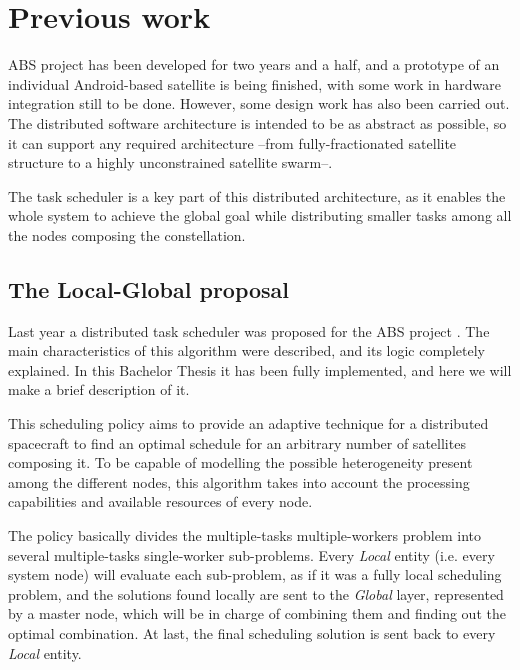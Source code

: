 \section{Previous work}

ABS project has been developed for two years and a half, and a prototype of an individual Android-based satellite is being finished, with some work in hardware integration still to be done. However, some design work has also been carried out. The distributed software architecture is intended to be as abstract as possible, so it can support any required architecture --from fully-fractionated satellite structure to a highly unconstrained satellite swarm--.

The task scheduler is a key part of this distributed architecture, as it enables the whole system to achieve the global goal while distributing smaller tasks among all the nodes composing the constellation.

\subsection{The Local-Global proposal}

Last year a distributed task scheduler was proposed for the ABS project \citep{Araguz15}. The main characteristics of this algorithm were described, and its logic completely explained. In this Bachelor Thesis it has been fully implemented, and here we will make a brief description of it.

This scheduling policy aims to provide an adaptive technique for a distributed spacecraft to find an optimal schedule for an arbitrary number of satellites composing it. To be capable of modelling the possible heterogeneity present among the different nodes, this algorithm takes into account the processing capabilities and available resources of every node.

The policy basically divides the multiple-tasks multiple-workers problem into several multiple-tasks single-worker sub-problems. Every \emph{Local} entity (i.e. every system node) will evaluate each sub-problem, as if it was a fully local scheduling problem, and the solutions found locally are sent to the \emph{Global} layer, represented by a master node, which will be in charge of combining them and finding out the optimal combination. At last, the final scheduling solution is sent back to every \emph{Local} entity.

